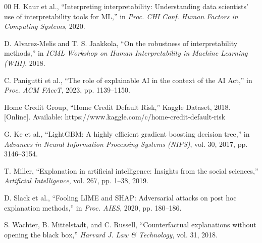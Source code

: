 \documentclass[conference]{IEEEtran}
\begin{document}
\begin{thebibliography}{00}
H. Kaur et al., ``Interpreting interpretability: Understanding data scientists' use of interpretability tools for ML,'' in \textit{Proc. CHI Conf. Human Factors in Computing Systems}, 2020.

D. Alvarez-Melis and T. S. Jaakkola, ``On the robustness of interpretability methods,'' in \textit{ICML Workshop on Human Interpretability in Machine Learning (WHI)}, 2018.

C. Panigutti et al., ``The role of explainable AI in the context of the AI Act,'' in \textit{Proc. ACM FAccT}, 2023, pp. 1139--1150.

Home Credit Group, ``Home Credit Default Risk,'' Kaggle Dataset, 2018. [Online]. Available: https://www.kaggle.com/c/home-credit-default-risk

G. Ke et al., ``LightGBM: A highly efficient gradient boosting decision tree,'' in \textit{Advances in Neural Information Processing Systems (NIPS)}, vol. 30, 2017, pp. 3146--3154.

T. Miller, ``Explanation in artificial intelligence: Insights from the social sciences,'' \textit{Artificial Intelligence}, vol. 267, pp. 1--38, 2019.

D. Slack et al., ``Fooling LIME and SHAP: Adversarial attacks on post hoc explanation methods,'' in \textit{Proc. AIES}, 2020, pp. 180--186.

S. Wachter, B. Mittelstadt, and C. Russell, ``Counterfactual explanations without opening the black box,'' \textit{Harvard J. Law \& Technology}, vol. 31, 2018.

\end{thebibliography}
\end{document}
